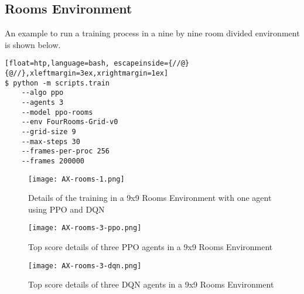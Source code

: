 \subsection{Rooms Environment}
An example to run a training process in a nine by nine room divided environment is shown below.

\begin{lstlisting}[float=htp,language=bash, escapeinside={//@}{@//},xleftmargin=3ex,xrightmargin=1ex]
$ python -m scripts.train 
    --algo ppo 
    --agents 3 
    --model ppo-rooms
    --env FourRooms-Grid-v0 
    --grid-size 9 
    --max-steps 30 
    --frames-per-proc 256 
    --frames 200000 
\end{lstlisting}

\newpage
\vfill
\begin{figure}
    \centering
    \texttt{[image: AX-rooms-1.png]}\\
    \caption[PPO and DQN Training Details with One Agent in a Rooms Environment]{Details of the training  in a 9x9 Rooms Environment with one agent using PPO and DQN}\label{fig:ax-rooms-1}
\end{figure}
\vfill
\clearpage


\newpage
\vfill
\begin{figure}
    \centering
    \texttt{[image: AX-rooms-3-ppo.png]}\\
    \caption[Training Details of Top PPO Competitive Executions in a Rooms Environment]{Top score details of three PPO agents in a 9x9 Rooms Environment}\label{fig:ax-rooms-3-ppo}
\end{figure}
\vfill
\clearpage


\newpage
\vfill
\begin{figure}
    \centering
    \texttt{[image: AX-rooms-3-dqn.png]}\\
    \caption[Training Details of Top DQN Competitive Executions in a Rooms Environment]{Top score details of three DQN agents in a 9x9 Rooms Environment}\label{fig:ax-rooms-3-dqn}
\end{figure}
\vfill
\clearpage
